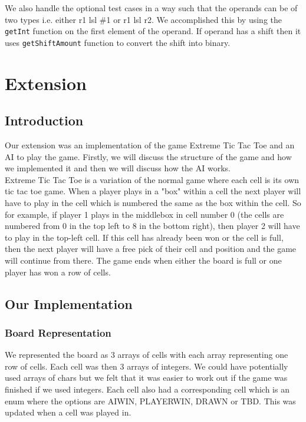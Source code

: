 \documentclass[10pt]{article}
\begin{document}
We also handle the optional test cases in a way such that the operands can be of two types i.e. either r1 lsl \#1 or r1 lsl r2. We accomplished this by using the {\tt{getInt}} function on the first element of the operand. If operand has a shift then it uses {\tt{getShiftAmount}} function to convert the shift into binary.

\section{Extension}
\subsection{Introduction}
Our extension was an implementation of the game Extreme Tic Tac Toe and an AI to play the game. Firstly, we will discuss the structure of the game and how we implemented it and then we will discuss how the AI works.
\\Extreme Tic Tac Toe is a variation of the normal game where each cell is its own tic tac toe game. When a player plays in a "box" within a cell the next player will have to play in the cell which is numbered the same as the box within the cell. So for example, if player 1 plays in the middlebox in cell number 0 (the cells are numbered from 0 in the top left to 8 in the bottom right), then player 2 will have to play in the top-left cell. If this cell has already been won or the cell is full, then the next player will have a free pick of their cell and position and the game will continue from there. The game ends when either the board is full or one player has won a row of cells.
\subsection{Our Implementation}
\subsubsection{Board Representation}
We represented the board as 3 arrays of cells with each array representing one row of cells. Each cell was then 3 arrays of integers. We could have potentially used arrays of chars but we felt that it was easier to work out if the game was finished if we used integers. Each cell also had a corresponding cell which is an enum where the options are AIWIN, PLAYERWIN, DRAWN or TBD. This was updated when a cell was played in.
\end{document}
